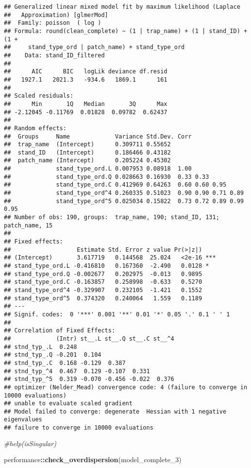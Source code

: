 \documentclass[
]{article}
\newenvironment{Shaded}{\begin{snugshade}}{\end{snugshade}}
\newcommand{\CommentTok}[1]{\textcolor[rgb]{0.56,0.35,0.01}{\textit{#1}}}
\newcommand{\FunctionTok}[1]{\textcolor[rgb]{0.13,0.29,0.53}{\textbf{#1}}}
\newcommand{\NormalTok}[1]{#1}
\newcommand{\SpecialCharTok}[1]{\textcolor[rgb]{0.81,0.36,0.00}{\textbf{#1}}}
\begin{document}
\begin{verbatim}
## Generalized linear mixed model fit by maximum likelihood (Laplace
##   Approximation) [glmerMod]
##  Family: poisson  ( log )
## Formula: round(clean_complete) ~ (1 | trap_name) + (1 | stand_ID) + (1 +  
##     stand_type_ord | patch_name) + stand_type_ord
##    Data: stand_ID_filtered
## 
##      AIC      BIC   logLik deviance df.resid 
##   1927.1   2021.3   -934.6   1869.1      161 
## 
## Scaled residuals: 
##      Min       1Q   Median       3Q      Max 
## -2.12045 -0.11769  0.01828  0.09782  0.62437 
## 
## Random effects:
##  Groups     Name             Variance Std.Dev. Corr                    
##  trap_name  (Intercept)      0.309711 0.55652                          
##  stand_ID   (Intercept)      0.186466 0.43182                          
##  patch_name (Intercept)      0.205224 0.45302                          
##             stand_type_ord.L 0.007953 0.08918  1.00                    
##             stand_type_ord.Q 0.028663 0.16930  0.33 0.33               
##             stand_type_ord.C 0.412969 0.64263  0.60 0.60 0.95          
##             stand_type_ord^4 0.260335 0.51023  0.90 0.90 0.71 0.89     
##             stand_type_ord^5 0.025034 0.15822  0.73 0.72 0.89 0.99 0.95
## Number of obs: 190, groups:  trap_name, 190; stand_ID, 131; patch_name, 15
## 
## Fixed effects:
##                   Estimate Std. Error z value Pr(>|z|)    
## (Intercept)       3.617719   0.144568  25.024   <2e-16 ***
## stand_type_ord.L -0.416810   0.167360  -2.490   0.0128 *  
## stand_type_ord.Q -0.002677   0.202975  -0.013   0.9895    
## stand_type_ord.C -0.163857   0.258998  -0.633   0.5270    
## stand_type_ord^4 -0.329907   0.232105  -1.421   0.1552    
## stand_type_ord^5  0.374320   0.240064   1.559   0.1189    
## ---
## Signif. codes:  0 '***' 0.001 '**' 0.01 '*' 0.05 '.' 0.1 ' ' 1
## 
## Correlation of Fixed Effects:
##             (Intr) st__.L st__.Q st__.C st__^4
## stnd_typ_.L  0.248                            
## stnd_typ_.Q -0.201  0.104                     
## stnd_typ_.C  0.168 -0.129  0.387              
## stnd_typ_^4  0.467  0.129 -0.107  0.331       
## stnd_typ_^5  0.319 -0.070 -0.456 -0.022  0.376
## optimizer (Nelder_Mead) convergence code: 4 (failure to converge in 10000 evaluations)
## unable to evaluate scaled gradient
## Model failed to converge: degenerate  Hessian with 1 negative eigenvalues
## failure to converge in 10000 evaluations
\end{verbatim}

\begin{Shaded}
\begin{Highlighting}[]
\CommentTok{\#help(\textquotesingle{}isSingular\textquotesingle{})}

\NormalTok{performance}\SpecialCharTok{::}\FunctionTok{check\_overdispersion}\NormalTok{(model\_complete\_3)}
\end{Highlighting}
\end{Shaded}
\end{document}
